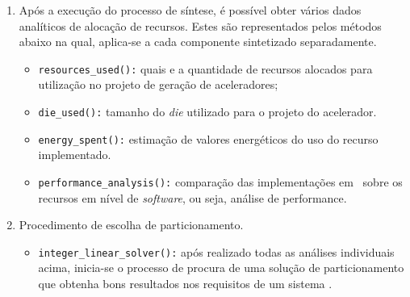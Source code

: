\begin{enumerate}
         \item Após a execução do processo de síntese, é possível obter vários dados analíticos de alocação de recursos. %
         Estes são representados pelos métodos abaixo na qual, aplica-se a cada componente sintetizado separadamente.
         \begin{itemize}
            \item \texttt{resources\_used():}
               quais e a quantidade de recursos alocados para utilização no projeto de geração de aceleradores;

            \item \texttt{die\_used():}
               tamanho do \textit{die} utilizado para o projeto do acelerador.

            \item \texttt{energy\_spent():}
               estimação de valores energéticos do uso do recurso implementado.%

            \item \texttt{performance\_analysis():}
               comparação das implementações em \hardware\ sobre os recursos em nível de \textit{software}, ou seja, análise de performance.
         \end{itemize}

         \item Procedimento de escolha de particionamento.
         \begin{itemize}
            \item \texttt{integer\_linear\_solver():}
               após realizado todas as análises individuais acima, inicia-se o processo de procura de uma solução de particionamento que obtenha bons resultados nos requisitos de um sistema \wearable.
         \end{itemize}
      \end{enumerate}


